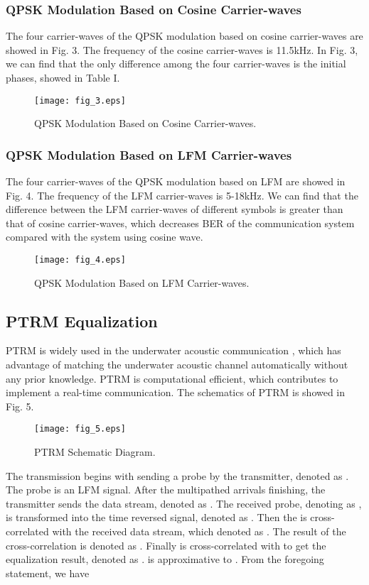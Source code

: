\documentclass[journal]{IEEEtran}
\begin{document}
\subsubsection{QPSK Modulation Based on Cosine Carrier-waves}
The four carrier-waves of the QPSK modulation based on cosine
carrier-waves are showed in Fig. 3. The frequency of the cosine
carrier-waves is 11.5kHz. In Fig. 3, we can find that the only
difference among the four carrier-waves is the initial phases,
showed in Table I.
\begin{figure}[!t]
\centering
\texttt{[image: fig\_3.eps]}
\caption{QPSK Modulation Based on Cosine Carrier-waves.}
\label{fig_sim}
\end{figure}
\subsubsection{QPSK Modulation Based on LFM Carrier-waves}
The four carrier-waves of the QPSK modulation based on LFM are
showed in Fig. 4. The frequency of the LFM carrier-waves is 5-18kHz.
We can find that the difference between the LFM carrier-waves of
different symbols is greater than that of cosine carrier-waves,
which decreases BER of the communication system compared with the
system using cosine wave.
\begin{figure}[!t]
\centering
\texttt{[image: fig\_4.eps]}
\caption{QPSK Modulation Based on LFM Carrier-waves.}
\label{fig_sim}
\end{figure}
\subsection{PTRM Equalization}
PTRM is widely used in the underwater acoustic communication
\cite{Stojanovic2008,Shahabudeen2008,Stojanovic2009}, which has
advantage of matching the underwater acoustic channel automatically
without any prior knowledge. PTRM is computational efficient, which
contributes to implement a real-time communication. The schematics
of PTRM is showed in Fig. 5.
\begin{figure}[!t]
\centering
\texttt{[image: fig\_5.eps]}
\caption{PTRM Schematic Diagram.} \label{fig_sim}
\end{figure}

The transmission begins with sending a probe by the transmitter,
denoted as . The probe is an LFM signal. After the multipathed
arrivals finishing, the transmitter sends the data stream, denoted
as . The received probe, denoting as , is transformed
into the time reversed signal, denoted as . Then the 
is cross-correlated with the received data stream, which denoted as
. The result of the cross-correlation is denoted as .
Finally  is cross-correlated with  to get the
equalization result, denoted as .  is approximative to
. From the foregoing statement, we have
\end{document}

